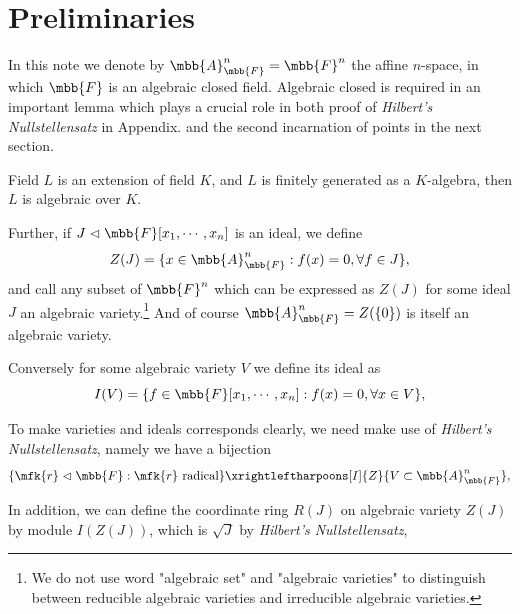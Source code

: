 \documentclass[12pt]{article}
\title{\tbf{Basic Affine Algebraic Geometry}}
\author{\tit{Cong Wen, 2019.07}}
\date{}
\begin{document}
\maketitle
{}
\tableofcontents
\section{Preliminaries}

In this note we denote by $\mbb{A}_{\mbb{F}}^n=\mbb{F}^n$ the affine $n$-space, in which $\mbb{F}$ is an algebraic closed field. Algebraic closed is required in an important lemma which plays a crucial role in both proof of \textit{Hilbert's Nullstellensatz} in Appendix. and the second incarnation of points in the next section.

\begin{lem}
	Field $L$ is an extension of field $K$, and $L$ is finitely generated as a $K$-algebra, then $L$ is algebraic over $K$.
\end{lem}

Further, if $J\vartriangleleft\mbb{F}[x_1,\cdots,x_n]$ is an ideal, we define
$$
Z(J)=\{x\in\mbb{A}_{\mbb{F}}^n:f(x)=0, \forall f\in J\},
$$
and call any subset of $\mbb{F}^n$ which can be expressed as $Z(J)$ for some ideal $J$ an algebraic variety.\footnote{We do not use word "algebraic set" and "algebraic varieties" to distinguish between reducible algebraic varieties and irreducible algebraic varieties.} And of course $\mbb{A}^n_{\mbb{F}}=Z(\{0\})$ is itself an algebraic variety.

Conversely for some algebraic variety $V$ we define its ideal as
$$
I(V)=\{f\in\mbb{F}[x_1,\cdots,x_n]:f(x)=0, \forall x\in V\},
$$

To make varieties and ideals corresponds clearly, we need make use of \textit{Hilbert's Nullstellensatz}, namely we have a bijection
$$
\{\mfk{r}\vartriangleleft\mbb{F}:\mfk{r}~\text{radical}\}\xrightleftharpoons[I]{Z}\{V\subset\mbb{A}^n_{\mbb{F}}\},
$$

In addition, we can define the coordinate ring $R(J)$ on algebraic variety $Z(J)$ by module $I(Z(J))$, which is $\sqrt{J}$ by \textit{Hilbert's Nullstellensatz},
\end{document}
